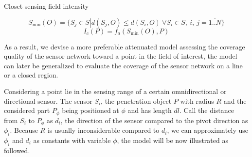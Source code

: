 Closet sensing field intensity

\begin{equation}
\label {eq6}
{S_{\min}(O)} = \{ {S_j} \in S\left| {d({S_j},O) \le d({S_i},O) \ \forall {S_i} \in S, \ i, \ j = \overline {1..N} } \right.\} 
\end{equation}
\begin{equation}
\label{eqic}
I_c(P) = f_a({S_{\min }(O)},P)
\end{equation}

As a result, we devise a more preferable attenuated model assessing the coverage quality of the sensor network toward a point in the field of interest, the model can later be generalized to evaluate the coverage of the sensor network on a line or a closed region.

Considering a point lie in the sensing range of a certain omnidirectional or directional sensor. The sensor $S_i$, the penetration object $P$ with radius $R$ and the considered part $P_\phi$ being positioned at $\phi$ and has length $dl$. Call the distance from $S_i$ to $P_\phi$ as $d_i$, the direction of the sensor compared to the pivot direction as $\phi_i$. Because $R$ is usually inconsiderable compared to $d_i$, we can approximately use $\phi_i$ and $d_i$ as constants with variable $\phi$, the model will be now illustrated as followed.

